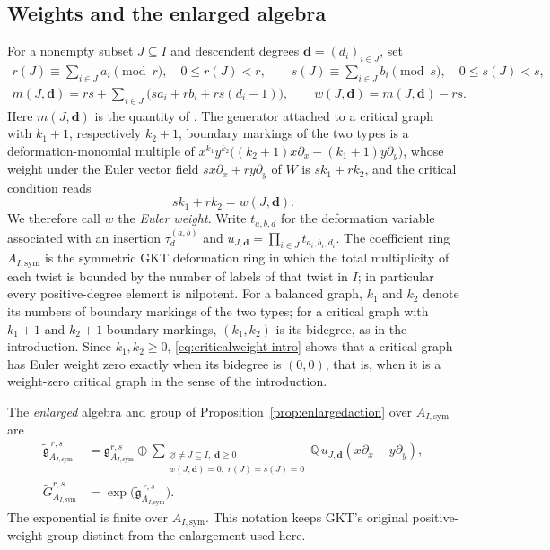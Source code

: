 \documentclass[11pt]{amsart}
\theoremstyle{definition}
\theoremstyle{remark}
\newcommand{\QQ}{\mathbb{Q}}
\newcommand{\gfrak}{\mathfrak{g}}
\begin{document}
\subsection*{Weights and the enlarged algebra}
For a nonempty subset $J\subseteq I$ and descendent degrees
$\mathbf d=(d_i)_{i\in J}$, set
\begin{gather}
 r(J)\equiv\sum_{i\in J}a_i\pmod r,\quad 0\le r(J)<r,
 \qquad
 s(J)\equiv\sum_{i\in J}b_i\pmod s,\quad 0\le s(J)<s,\label{eq:residues}\\
 m(J,\mathbf d)
 =rs+\sum_{i\in J}\bigl(sa_i+rb_i+rs(d_i-1)\bigr),
 \qquad w(J,\mathbf d)=m(J,\mathbf d)-rs.\label{eq:massweight}
\end{gather}
Here $m(J,\mathbf d)$ is the quantity of \cite[Notation~2.30]{GKT}.  The generator attached to a critical graph with
$k_1+1$, respectively $k_2+1$, boundary markings of the two types is a
deformation-monomial multiple of
$x^{k_1}y^{k_2}\bigl((k_2+1)x\partial_x-(k_1+1)y\partial_y\bigr)$, whose weight
under the Euler vector field $sx\partial_x+ry\partial_y$ of $W$ is
$sk_1+rk_2$, and the critical condition \cite[Proposition~2.39]{GKT} reads
\begin{equation}
 sk_1+rk_2=w(J,\mathbf d).
 \label{eq:criticalweight-intro}
\end{equation}
We therefore call $w$ the \emph{Euler weight}.  Write $t_{a,b,d}$ for the
deformation variable associated with an insertion $\tau_d^{(a,b)}$ and
$u_{J,\mathbf d}=\prod_{i\in J}t_{a_i,b_i,d_i}$.  The coefficient ring
$A_{I,\mathrm{sym}}$ is the symmetric GKT deformation ring in which the total
multiplicity of each twist is bounded by the number of labels of that twist in
$I$; in particular every positive-degree element is nilpotent.
For a balanced graph, $k_1$ and $k_2$ denote its numbers of boundary markings
of the two types; for a critical graph with $k_1+1$ and $k_2+1$ boundary
markings, $(k_1,k_2)$ is its bidegree, as in the introduction.  Since
$k_1,k_2\ge0$, \eqref{eq:criticalweight-intro} shows that a critical graph has
Euler weight zero exactly when its bidegree is $(0,0)$, that is, when it is a
weight-zero critical graph in the sense of the introduction.

The \emph{enlarged} algebra and group of Proposition~\ref{prop:enlargedaction} over
$A_{I,\mathrm{sym}}$ are
\begin{equation}
\begin{aligned}
 \widetilde{\gfrak}^{\,r,s}_{A_{I,\mathrm{sym}}}
 &=\gfrak^{r,s}_{A_{I,\mathrm{sym}}}
 \oplus\!\!\sum_{\substack{\varnothing\ne J\subseteq I,\;\mathbf d\ge0\\
 w(J,\mathbf d)=0,\;r(J)=s(J)=0}}
 \QQ\,u_{J,\mathbf d}(x\partial_x-y\partial_y),\\
 \widetilde G^{r,s}_{A_{I,\mathrm{sym}}}
 &=\exp\bigl(\widetilde{\gfrak}^{\,r,s}_{A_{I,\mathrm{sym}}}\bigr).
\end{aligned}
\label{eq:enlargedgroup}
\end{equation}
The exponential is finite over $A_{I,\mathrm{sym}}$.  This notation keeps
GKT's original positive-weight group distinct from the enlargement used here.
\end{document}
